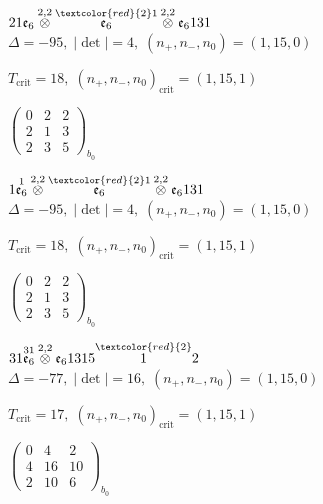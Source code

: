 \documentclass[10pt]{article}
\begin{document}
\smallskip

$21\mathfrak{e}_6\overset{2,2}{\otimes}\overset{\textcolor{red}{2}1}{\mathfrak{e}_6}\overset{2,2}{\otimes}\mathfrak{e}_6131$ \quad $\Delta=-95,\; |\det|=4,\; (n_+,n_-,n_0)=(1,15,0)$

\hspace{1em}$T_{\text{crit}}=18,\; (n_+,n_-,n_0)_{\text{crit}}=(1,15,1)$

\hspace{2em}$\left(\begin{smallmatrix}0 & 2 & 2 \\ 2 & 1 & 3 \\ 2 & 3 & 5\end{smallmatrix}\right)_{\!b_0}$

\smallskip

$1\overset{1}{\mathfrak{e}_6}\overset{2,2}{\otimes}\overset{\textcolor{red}{2}1}{\mathfrak{e}_6}\overset{2,2}{\otimes}\mathfrak{e}_6131$ \quad $\Delta=-95,\; |\det|=4,\; (n_+,n_-,n_0)=(1,15,0)$

\hspace{1em}$T_{\text{crit}}=18,\; (n_+,n_-,n_0)_{\text{crit}}=(1,15,1)$

\hspace{2em}$\left(\begin{smallmatrix}0 & 2 & 2 \\ 2 & 1 & 3 \\ 2 & 3 & 5\end{smallmatrix}\right)_{\!b_0}$

\smallskip

$31\overset{31}{\mathfrak{e}_6}\overset{2,2}{\otimes}\mathfrak{e}_61315\overset{\textcolor{red}{2}}{1}2$ \quad $\Delta=-77,\; |\det|=16,\; (n_+,n_-,n_0)=(1,15,0)$

\hspace{1em}$T_{\text{crit}}=17,\; (n_+,n_-,n_0)_{\text{crit}}=(1,15,1)$

\hspace{2em}$\left(\begin{smallmatrix}0 & 4 & 2 \\ 4 & 16 & 10 \\ 2 & 10 & 6\end{smallmatrix}\right)_{\!b_0}$
\end{document}

